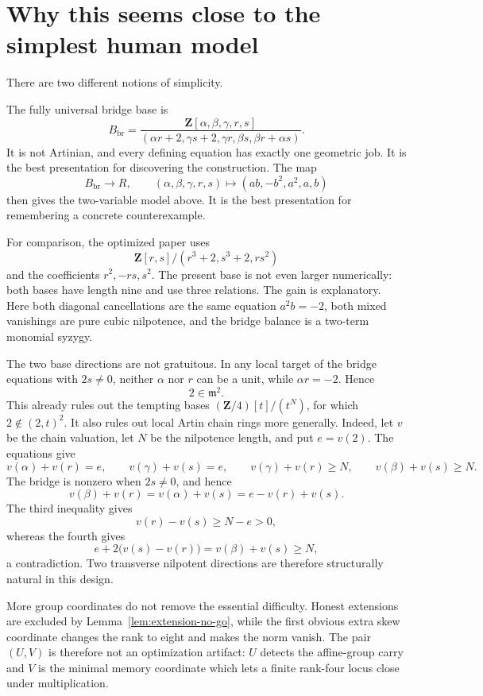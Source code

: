 \documentclass[11pt]{amsart}
\theoremstyle{definition}
\theoremstyle{remark}
\newcommand{\Z}{\mathbf Z}
\newcommand{\m}{\mathfrak m}
\begin{document}
\section{Why this seems close to the simplest human model}

There are two different notions of simplicity.

The fully universal bridge base is
\[
 B_{\mathrm{br}}
 =
 \frac{\Z[\alpha,\beta,\gamma,r,s]}
 {(\alpha r+2,\gamma s+2,\gamma r,\beta s,\beta r+\alpha s)}.
\]
It is not Artinian, and every defining equation has exactly one geometric
job.  It is the best presentation for discovering the construction.
The map
\[
 B_{\mathrm{br}}\longrightarrow R,\qquad
 (\alpha,\beta,\gamma,r,s)
 \longmapsto(ab,-b^2,a^2,a,b)
\]
then gives the two-variable model above.  It is the best presentation for
remembering a concrete counterexample.

For comparison, the optimized paper uses
\[
 \Z[r,s]/(r^3+2,s^3+2,rs^2)
\]
and the coefficients \(r^2,-rs,s^2\).  The present base is not even
larger numerically: both bases have length nine and use three relations.
The gain is explanatory.  Here both diagonal cancellations are the same
equation \(a^2b=-2\), both mixed vanishings are pure cubic nilpotence, and
the bridge balance is a two-term monomial syzygy.

The two base directions are not gratuitous.  In any local target of the
bridge equations with \(2s\ne0\), neither \(\alpha\) nor \(r\) can be a
unit, while \(\alpha r=-2\).  Hence
\[
 2\in\m^2.
\]
This already rules out the tempting bases
\((\Z/4)[t]/(t^N)\), for which \(2\notin(2,t)^2\).  It also rules out
local Artin chain rings more generally.  Indeed, let \(v\) be the chain
valuation, let \(N\) be the nilpotence length, and put \(e=v(2)\).
The equations give
\[
 v(\alpha)+v(r)=e,\qquad
 v(\gamma)+v(s)=e,\qquad
 v(\gamma)+v(r)\ge N,\qquad
 v(\beta)+v(s)\ge N.
\]
The bridge is nonzero when \(2s\ne0\), and hence
\[
 v(\beta)+v(r)
 =v(\alpha)+v(s)=e-v(r)+v(s).
\]
The third inequality gives
\[
 v(r)-v(s)\ge N-e>0,
\]
whereas the fourth gives
\[
 e+2\bigl(v(s)-v(r)\bigr)
 =v(\beta)+v(s)\ge N,
\]
a contradiction.  Two transverse nilpotent directions are therefore
structurally natural in this design.

More group coordinates do not remove the essential difficulty.  Honest
extensions are excluded by Lemma~\ref{lem:extension-no-go}, while the
first obvious extra skew coordinate changes the rank to eight and makes
the norm vanish.  The pair \((U,V)\) is therefore not an optimization
artifact: \(U\) detects the affine-group carry and \(V\) is the minimal
memory coordinate which lets a finite rank-four locus close under
multiplication.
\end{document}
